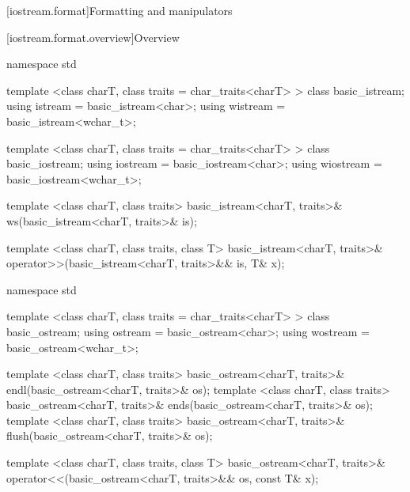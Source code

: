 [iostream.format]{Formatting and manipulators}

[iostream.format.overview]{Overview}

%

\begin{codeblock}
namespace std {
  template <class charT, class traits = char_traits<charT> >
    class basic_istream;
  using istream  = basic_istream<char>;
  using wistream = basic_istream<wchar_t>;

  template <class charT, class traits = char_traits<charT> >
    class basic_iostream;
  using iostream  = basic_iostream<char>;
  using wiostream = basic_iostream<wchar_t>;

  template <class charT, class traits>
    basic_istream<charT, traits>& ws(basic_istream<charT, traits>& is);

  template <class charT, class traits, class T>
    basic_istream<charT, traits>&
    operator>>(basic_istream<charT, traits>&& is, T& x);
}
\end{codeblock}

%
%
%
%

%

\begin{codeblock}
namespace std {
  template <class charT, class traits = char_traits<charT> >
    class basic_ostream;
  using ostream  = basic_ostream<char>;
  using wostream = basic_ostream<wchar_t>;

  template <class charT, class traits>
    basic_ostream<charT, traits>& endl(basic_ostream<charT, traits>& os);
  template <class charT, class traits>
    basic_ostream<charT, traits>& ends(basic_ostream<charT, traits>& os);
  template <class charT, class traits>
    basic_ostream<charT, traits>& flush(basic_ostream<charT, traits>& os);

  template <class charT, class traits, class T>
    basic_ostream<charT, traits>&
    operator<<(basic_ostream<charT, traits>&& os, const T& x);
}
\end{codeblock}

%
%
%
%

